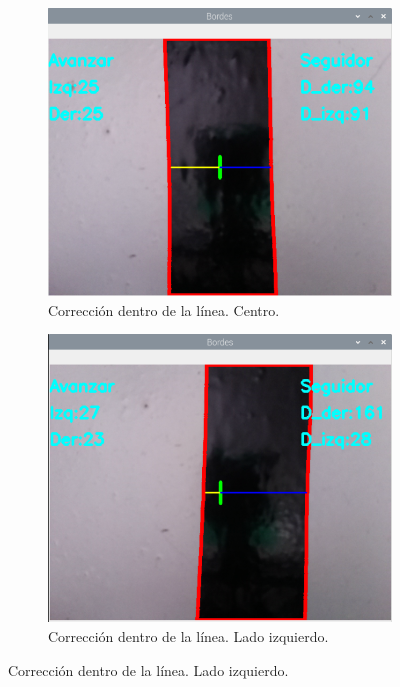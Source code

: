 \documentclass[11pt,a4paper]{article}
\begin{document}
\begin{itemize}
		\begin{figure}[h!]
			\centering
			\begin{subfigure}{0.45\textwidth}
				\includegraphics[width=\textwidth]{imagenes/seguidor_centro.png}
				\caption{Corrección dentro de la línea. Centro.}
				\label{subfig:seguidor_centro}
			\end{subfigure}
			\hfill
			\begin{subfigure}{0.45\textwidth}
				\includegraphics[width=\textwidth]{imagenes/seguidor_izq.png}
				\caption{Corrección dentro de la línea. Lado izquierdo.}

\end{subfigure}
\end{figure}
\end{itemize}
\end{document}
